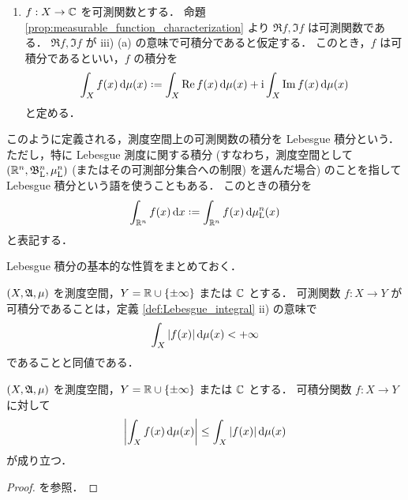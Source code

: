 \begin{definition}
\begin{enumerate}
\begin{enumerate}
                \item
                    $f:X\to\mathbb{C}$ を可測関数とする．
                    命題 \ref{prop:measurable_function_characterization} より $\Re f,\Im f$ は可測関数である．
                    $\Re f,\Im f$ が \textrm{iii)} (a) の意味で可積分であると仮定する．
                    このとき，$f$ は可積分であるといい，$f$ の積分を
                    \begin{align*}
                        \int_Xf(x)\,\drm\mu(x)\defeq\int_X\Re f(x)\,\drm\mu(x)+\im\int_X\Im f(x)\,\drm\mu(x)
                    \end{align*}
                    と定める．
            \end{enumerate}
    \end{enumerate}
\end{definition}

このように定義される，測度空間上の可測関数の積分を Lebesgue 積分という．
ただし，特に Lebesgue 測度に関する積分
(すなわち，測度空間として $(\mathbb{R}^n,\mathfrak{B}_{\mathrm{L}}^n,\mu_{\mathrm{L}}^n)$ (またはその可測部分集合への制限) を選んだ場合)
のことを指して Lebesgue 積分という語を使うこともある．
このときの積分を
\begin{align*}
    \int_{\Rbb^n}f(x)\,\drm x\defeq\int_{\Rbb^n}f(x)\,\drm\mu_\Lrm^n(x)
\end{align*}
と表記する．

Lebesgue 積分の基本的な性質をまとめておく．

\begin{proposition}
    $(X,\mathfrak{A},\mu)$ を測度空間，$Y=\mathbb{R}\cup\{\pm\infty\} $ または $\mathbb{C}$ とする．
    可測関数 $f:X\to Y$ が可積分であることは，定義 \ref{def:Lebesgue_integral} \textrm{ii)} の意味で
    \begin{align*}
        \int_X|f(x)|\,\mathrm{d}\mu(x)<+\infty
    \end{align*}
    であることと同値である．
\end{proposition}

\begin{theorem}
    $(X,\mathfrak{A},\mu)$ を測度空間，$Y=\mathbb{R}\cup\{\pm\infty\} $ または $\mathbb{C}$ とする．
    可積分関数 $f:X\to Y$ に対して
    \begin{align*}
        \left\lvert\int_Xf(x)\,\mathrm{d}\mu(x)\right\rvert
        \le\int_X|f(x)|\,\mathrm{d}\mu(x)
    \end{align*}
    が成り立つ．
\end{theorem}

\begin{proof}
    \cite[定理 12.1]{It63} を参照．
\end{proof}

